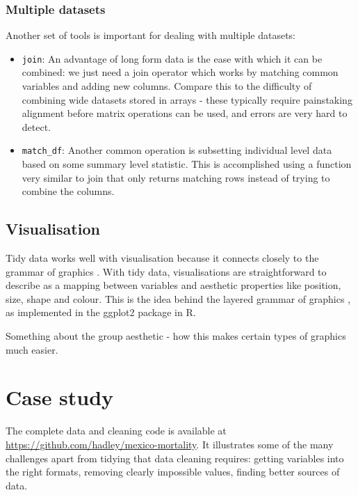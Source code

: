 \documentclass[oneside]{article}
\begin{document}
\subsubsection{Multiple datasets}

Another set of tools is important for dealing with multiple datasets: 

\begin{itemize}

\item {\tt join}: An advantage of long form data is the ease with which it can be combined: we just need a join operator which works by matching common variables and adding new columns. Compare this to the difficulty of combining wide datasets stored in arrays - these typically require painstaking alignment before matrix operations can be used, and errors are very hard to detect. 

\item {\tt match\_df}: Another common operation is subsetting individual level data based on some summary level statistic. This is accomplished using a function very similar to join that only returns matching rows instead of trying to combine the columns.

\end{itemize}

\subsection{Visualisation}

Tidy data works well with visualisation because it connects closely to the grammar of graphics \citep{wilkinson:2006}. With tidy data, visualisations are straightforward to describe as a mapping between variables and aesthetic properties like position, size, shape and colour. This is the idea behind the layered grammar of graphics \citep{wickham:2007d}, as implemented in the ggplot2 package in R.

Something about the group aesthetic - how this makes certain types of graphics much easier.

\section{Case study} 

The complete data and cleaning code is available at \url{https://github.com/hadley/mexico-mortality}.  It illustrates some of the many challenges apart from tidying that data cleaning requires: getting variables into the right formats, removing clearly impossible values, finding better sources of data. 
\end{document}

